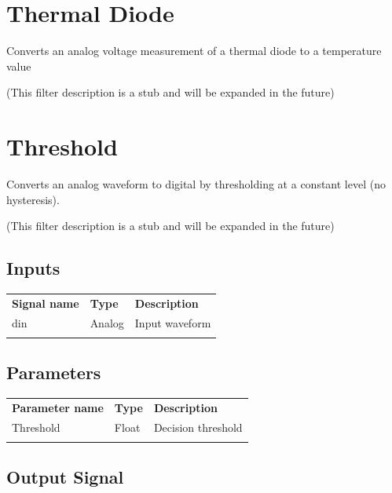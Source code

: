 \pagebreak
\section{Thermal Diode}

Converts an analog voltage measurement of a thermal diode to a temperature value

(This filter description is a stub and will be expanded in the future)

\pagebreak
\section{Threshold}
\label{filter:threshold}

Converts an analog waveform to digital by thresholding at a constant level (no hysteresis).

(This filter description is a stub and will be expanded in the future)

\subsection{Inputs}

\begin{tabularx}{16cm}{llX}
\thickhline
\textbf{Signal name} & \textbf{Type} & \textbf{Description} \\
\thickhline
din & Analog & Input waveform \\
\thickhline
\end{tabularx}

\subsection{Parameters}

\begin{tabularx}{16cm}{llX}
\thickhline
\textbf{Parameter name} & \textbf{Type} & \textbf{Description} \\
\thickhline
Threshold & Float & Decision threshold \\
\thickhline
\end{tabularx}

\subsection{Output Signal}

